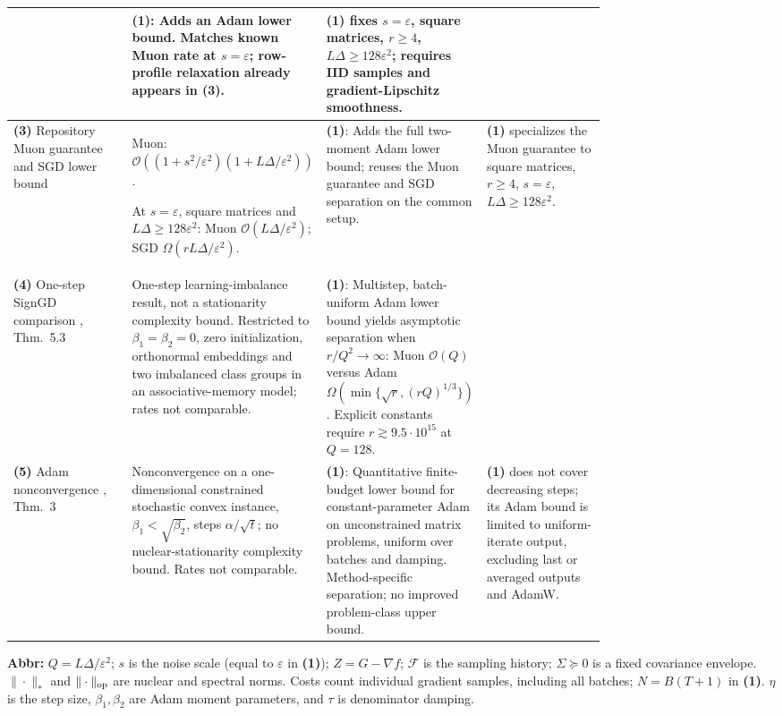 \begin{table}[tp]
\begin{threeparttable}
\begin{tabularx}{\linewidth}{@{}>{\raggedright\arraybackslash}p{0.20\linewidth}>{\raggedright\arraybackslash}p{0.32\linewidth}>{\raggedright\arraybackslash}p{0.25\linewidth}>{\raggedright\arraybackslash}X@{}}
& \textbf{(1)}: Adds an Adam lower bound. Matches known Muon rate at $s=\varepsilon$; row-profile relaxation already appears in \textbf{(3)}.
& \textbf{(1)} fixes $s=\varepsilon$, square matrices, $r\ge4$, $L\Delta\ge128\varepsilon^2$; requires IID samples and gradient-Lipschitz smoothness. \\
\midrule
\textbf{(3)} Repository Muon guarantee and SGD lower bound \citep{ssacMuonRepository,ssacSgdRepository}
& Muon: $\mathcal O((1+s^2/\varepsilon^2)(1+L\Delta/\varepsilon^2))$.\par At $s=\varepsilon$, square matrices and $L\Delta\ge128\varepsilon^2$: Muon $\mathcal O(L\Delta/\varepsilon^2)$; SGD $\Omega(rL\Delta/\varepsilon^2)$.
& \textbf{(1)}: Adds the full two-moment Adam lower bound; reuses the Muon guarantee and SGD separation on the common setup.
& \textbf{(1)} specializes the Muon guarantee to square matrices, $r\ge4$, $s=\varepsilon$, $L\Delta\ge128\varepsilon^2$. \\
\midrule
\textbf{(4)} One-step SignGD comparison \citep{ssacWang2025v2}, Thm.~5.3
& One-step learning-imbalance result, not a stationarity complexity bound. Restricted to $\beta_1=\beta_2=0$, zero initialization, orthonormal embeddings and two imbalanced class groups in an associative-memory model; rates not comparable.
& \textbf{(1)}: Multistep, batch-uniform Adam lower bound yields asymptotic separation when $r/Q^2\to\infty$: Muon $\mathcal O(Q)$ versus Adam $\Omega(\min\{\sqrt r,(rQ)^{1/3}\})$. Explicit constants require $r\gtrsim9.5\cdot10^{15}$ at $Q=128$.
& \\
\midrule
\textbf{(5)} Adam nonconvergence \citep{ssacReddi2018}, Thm.~3
& Nonconvergence on a one-dimensional constrained stochastic convex instance, $\beta_1<\sqrt{\beta_2}$, steps $\alpha/\sqrt t$; no nuclear-stationarity complexity bound. Rates not comparable.
& \textbf{(1)}: Quantitative finite-budget lower bound for constant-parameter Adam on unconstrained matrix problems, uniform over batches and damping. Method-specific separation; no improved problem-class upper bound.
& \textbf{(1)} does not cover decreasing steps; its Adam bound is limited to uniform-iterate output, excluding last or averaged outputs and AdamW. \\
\bottomrule
\end{tabularx}
\begin{tablenotes}[flushleft]\footnotesize
\item[] \textbf{Abbr:} $Q=L\Delta/\varepsilon^2$; $s$ is the noise scale (equal to $\varepsilon$ in \textbf{(1)}); $Z=G-\nabla f$; $\mathcal F$ is the sampling history; $\Sigma\succeq0$ is a fixed covariance envelope. $\|\cdot\|_*$ and $\|\cdot\|_{\rm op}$ are nuclear and spectral norms. Costs count individual gradient samples, including all batches; $N=B(T+1)$ in \textbf{(1)}. $\eta$ is the step size, $\beta_1,\beta_2$ are Adam moment parameters, and $\tau$ is denominator damping.
\end{tablenotes}
\end{threeparttable}
\end{table}
